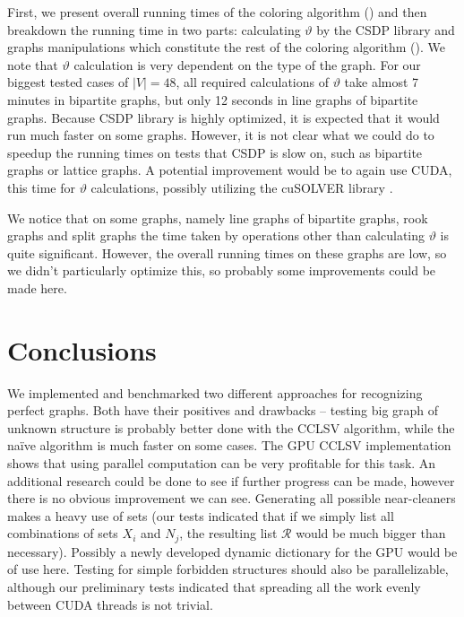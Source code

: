 First, we present overall running times of the coloring algorithm () and then breakdown the running time in two parts: calculating $\vartheta$ by the CSDP library and graphs manipulations which constitute the rest of the coloring algorithm (). We note that $\vartheta$ calculation is very dependent on the type of the graph. For our biggest tested cases of $|V| = 48$, all required calculations of $\vartheta$ take almost 7 minutes in bipartite graphs, but only 12 seconds in line graphs of bipartite graphs. Because CSDP library is highly optimized, it is expected that it would run much faster on some graphs. However, it is not clear what we could do to speedup the running times on tests that CSDP is slow on, such as bipartite graphs or lattice graphs. A potential improvement would be to again use CUDA, this time for $\vartheta$ calculations, possibly utilizing the cuSOLVER library \cite{cusolver}.


We notice that on some graphs, namely line graphs of bipartite graphs, rook graphs and split graphs the time taken by operations other than calculating $\vartheta$ is quite significant. However, the overall running times on these graphs are low, so we didn't particularly optimize this, so probably some improvements could be made here.

\section{Conclusions}
We implemented and benchmarked two different approaches for recognizing perfect graphs. Both have their positives and drawbacks -- testing big graph of unknown structure is probably better done with the CCLSV algorithm, while the na\"ive algorithm is much faster on some cases. The GPU CCLSV implementation shows that using parallel computation can be very profitable for this task. An additional research could be done to see if further progress can be made, however there is no obvious improvement we can see. Generating all possible near-cleaners makes a heavy use of sets (our tests indicated that if we simply list all combinations of sets $X_i$ and $N_j$, the resulting list $\mathcal{R}$ would be much bigger than necessary). Possibly a newly developed dynamic dictionary for the GPU \cite{Ashkiani2018} would be of use here. Testing for simple forbidden structures should also be parallelizable, although our preliminary tests indicated that spreading all the work evenly between CUDA threads is not trivial.


